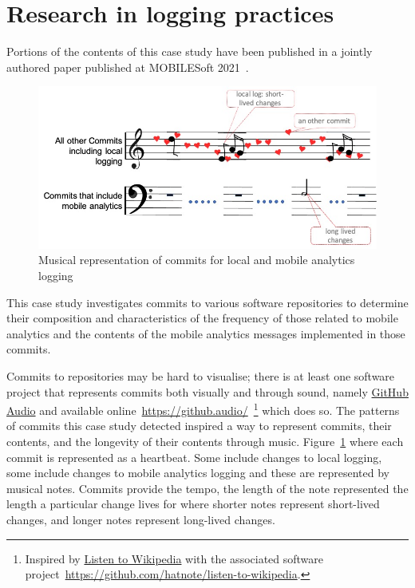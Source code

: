 \section{Research in logging practices}
\label{section-research-in-logging-practices}
Portions of the contents of this case study have been published in a jointly authored paper published at MOBILESoft 2021~\citep{harty2021_logging_practices_with_mobile_analytics}.

\begin{figure}
    \centering
    \includegraphics[width=15cm]{images/mobile-analytics-logging/musical-illustration.jpg}
    \caption{Musical representation of commits for local and mobile analytics logging}
    \label{fig:mobile_analytics_logging_musical_illustration}
\end{figure}

This case study investigates commits to various software repositories to determine their composition and characteristics of the frequency of those related to mobile analytics and the contents of the mobile analytics messages implemented in those commits. 

Commits to repositories may be hard to visualise; there is at least one software project that represents commits both visually and through sound, namely \href{https://github.com/debugger22/github-audio}{GitHub Audio} and available online~\url{https://github.audio/}~\footnote{Inspired by \href{http://listen.hatnote.com/\#}{Listen to Wikipedia} with the associated software project~\url{https://github.com/hatnote/listen-to-wikipedia}.} which does so. The patterns of commits this case study detected inspired a way to represent commits, their contents, and the longevity of their contents through music. Figure~\ref{fig:mobile_analytics_logging_musical_illustration} where each commit is represented as a heartbeat. Some include changes to local logging, some include changes to mobile analytics logging and these are represented by musical notes. Commits provide the tempo, the length of the note represented the length a particular change lives for where shorter notes represent short-lived changes, and longer notes represent long-lived changes. 

